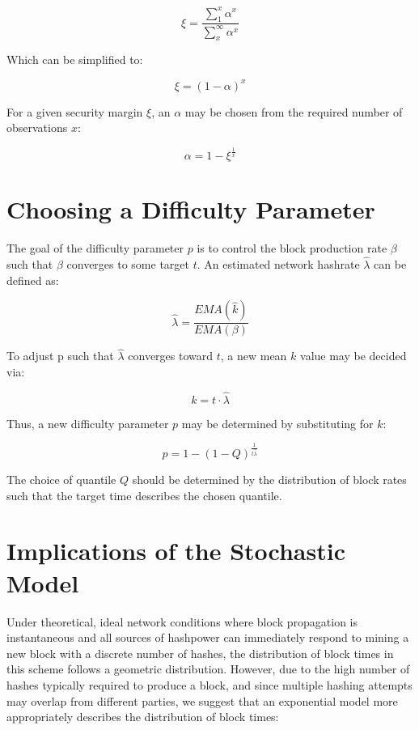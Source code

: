\documentclass[]{article}
\begin{document}
\begin{equation}
\xi = \frac{\sum_{1}^{x} \alpha^x}{\sum_{x}^{\infty} \alpha^x}
\end{equation}

Which can be simplified to: 

\begin{equation}
	\xi = (1 - \alpha)^x
\end{equation}

For a given security margin $\xi$, an $\alpha$ may be chosen from the required number of observations $x$: 

\begin{equation}
\alpha = 1 - \xi^\frac{1}{x}
\end{equation}

\section{Choosing a Difficulty Parameter}
The goal of the difficulty parameter $p$ is to control the block production rate $\beta$ such that $\beta$ converges to some target $t$.  An estimated network hashrate $\hat{\lambda}$ can be defined as: 

\begin{equation}
\hat{\lambda} = \frac{EMA(\hat{k})}{EMA(\beta)}
\end{equation}

To adjust p such that $\hat{\lambda}$ converges toward $t$, a new mean $k$ value may be decided via:

\begin{equation}
	k = t \cdot \hat{\lambda}
\end{equation} 

Thus, a new difficulty parameter $p$ may be determined by substituting for $k$: 

\begin{equation}
p = 1 - (1 - Q)^\frac{1}{t \hat{\lambda}} 
\end{equation}

The choice of quantile $Q$ should be determined by the distribution of block rates such that the target time describes the chosen quantile. 

\section{Implications of the Stochastic Model}  
Under theoretical, ideal network conditions where block propagation is instantaneous and all sources of hashpower can immediately respond to mining a new block with a discrete number of hashes, the distribution of block times in this scheme follows a geometric distribution.  However, due to the high number of hashes typically required to produce a block, and since multiple hashing attempts may overlap from different parties, we suggest that an exponential model more appropriately describes the distribution of block times: 
\end{document}

